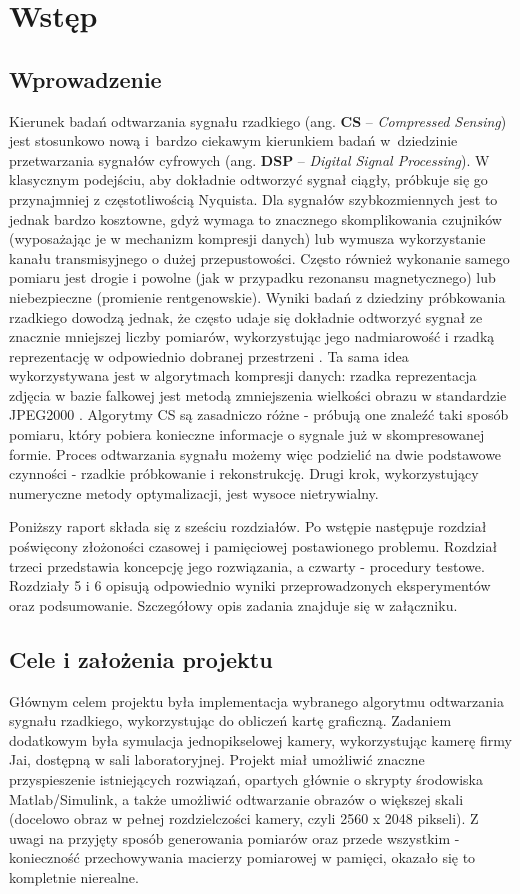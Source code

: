 \section{Wstęp}
\subsection{Wprowadzenie}
Kierunek badań odtwarzania sygnału rzadkiego (ang. \textbf{CS} – \textit{Compressed Sensing}) jest stosunkowo nową i bardzo ciekawym kierunkiem badań w~dziedzinie przetwarzania sygnałów cyfrowych (ang. \textbf{DSP} – \textit{Digital Signal Processing}). W klasycznym podejściu, aby dokładnie odtworzyć sygnał ciągły, próbkuje się go przynajmniej z częstotliwością Nyquista. Dla sygnałów szybkozmiennych jest to jednak bardzo kosztowne, gdyż wymaga to znacznego skomplikowania czujników (wyposażając je w mechanizm kompresji danych) lub wymusza wykorzystanie kanału transmisyjnego o dużej przepustowości. Często również wykonanie samego pomiaru jest drogie i powolne (jak w przypadku rezonansu magnetycznego) lub niebezpieczne (promienie rentgenowskie). Wyniki badań z dziedziny próbkowania rzadkiego dowodzą jednak, że często udaje się dokładnie odtworzyć sygnał ze znacznie mniejszej liczby pomiarów, wykorzystując jego nadmiarowość i rzadką reprezentację w odpowiednio dobranej przestrzeni \cite{IntroductionCS}. Ta sama idea wykorzystywana jest w algorytmach kompresji danych: rzadka reprezentacja zdjęcia w bazie falkowej jest metodą zmniejszenia wielkości obrazu w standardzie JPEG2000 \cite{JPEG2000}. Algorytmy CS są zasadniczo różne - próbują one znaleźć taki sposób pomiaru, który pobiera konieczne informacje o sygnale już w skompresowanej formie. Proces odtwarzania sygnału możemy więc podzielić na dwie podstawowe czynności - rzadkie próbkowanie i rekonstrukcję. Drugi krok, wykorzystujący numeryczne metody optymalizacji, jest wysoce nietrywialny. 

Poniższy raport składa się z sześciu rozdziałów. Po wstępie następuje rozdział poświęcony złożoności czasowej i pamięciowej postawionego problemu. Rozdział trzeci przedstawia koncepcję jego rozwiązania, a czwarty - procedury testowe. Rozdziały 5 i 6 opisują odpowiednio wyniki przeprowadzonych eksperymentów oraz podsumowanie. Szczegółowy opis zadania znajduje się w załączniku.
\subsection{Cele i założenia projektu}
Głównym celem projektu była implementacja wybranego algorytmu odtwarzania sygnału rzadkiego, wykorzystując do obliczeń kartę graficzną. Zadaniem dodatkowym była symulacja jednopikselowej kamery, wykorzystując kamerę firmy Jai, dostępną w sali laboratoryjnej. Projekt miał umożliwić znaczne przyspieszenie istniejących rozwiązań, opartych głównie o skrypty środowiska Matlab/Simulink, a także umożliwić odtwarzanie obrazów o większej skali (docelowo obraz w pełnej rozdzielczości kamery, czyli 2560 x 2048 pikseli). Z uwagi na przyjęty sposób generowania pomiarów oraz przede wszystkim - konieczność przechowywania macierzy pomiarowej w pamięci, okazało się to kompletnie nierealne.
